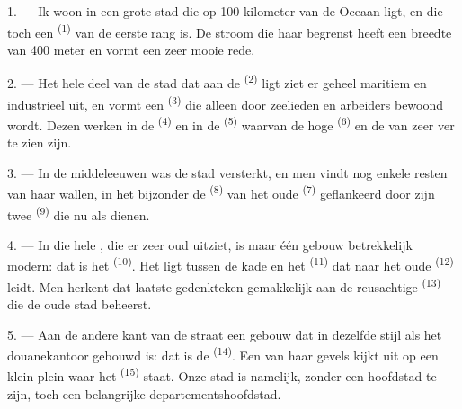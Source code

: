
\VUsaut{2.0mm}
\VUsaut{3.0mm}
\VUfilet{16mm}
\VUsaut{5.6mm}
\VUsaut{1.4mm}
\VUsaut{2.2mm}

\VUsaut{3.0mm}

1. --- Ik woon in een grote stad die op 100 kilometer van de Oceaan ligt, en die toch een
 \textsuperscript{(1)} van de eerste rang is. De stroom die haar begrenst heeft
een breedte van 400 meter en vormt een zeer mooie rede.

2. --- Het hele deel van de stad dat aan de  \textsuperscript{(2)} ligt ziet er
geheel maritiem en industrieel uit, en vormt een  \textsuperscript{(3)} die
alleen door zeelieden en arbeiders bewoond wordt. Dezen werken in de 
\textsuperscript{(4)} en in de  \textsuperscript{(5)} waarvan de hoge
 \textsuperscript{(6)} en de  van zeer ver te zien zijn.

3. --- In de middeleeuwen was de stad versterkt, en men vindt nog enkele resten van haar
wallen, in het bijzonder de  \textsuperscript{(8)} van het oude
 \textsuperscript{(7)} geflankeerd door zijn twee 
\textsuperscript{(9)} die nu als  dienen.

4. --- In die hele , die er zeer oud uitziet, is maar één gebouw betrekkelijk
modern: dat is het  \textsuperscript{(10)}. Het ligt tussen de kade en
het  \textsuperscript{(11)} dat naar het oude 
\textsuperscript{(12)} leidt. Men herkent dat laatste gedenkteken gemakkelijk aan de
reusachtige  \textsuperscript{(13)} die de oude stad beheerst.

5. --- Aan de andere kant van de straat  een gebouw dat in dezelfde stijl als
het douanekantoor gebouwd is: dat is de  \textsuperscript{(14)}. Een van haar
gevels kijkt uit op een klein plein waar het
 \textsuperscript{(15)} staat. Onze stad is namelijk,
zonder een hoofdstad te zijn, toch een belangrijke departementshoofdstad.

